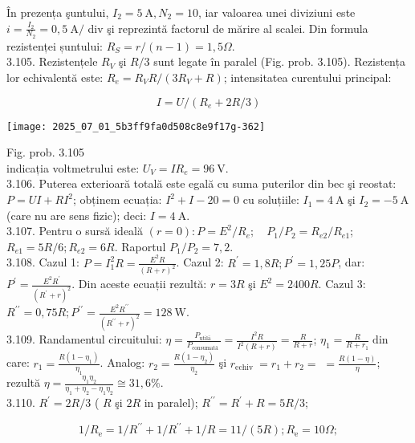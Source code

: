 În prezența şuntului, $I_{2}=5 \mathrm{~A}, N_{2}=10$, iar valoarea unei diviziuni este $i=\frac{I_{2}}{N_{2}}=0,5 \mathrm{~A} /$ div şi reprezintă factorul de mărire al scalei. Din formula rezistenței șuntului: $R_{S}=r /(n-1)=1,5 \Omega$.\\
3.105. Rezistențele $R_{V}$ şi $R / 3$ sunt legate în paralel (Fig. prob. 3.105). Rezistența lor echivalentă este: $R_{e}=R_{V} R /\left(3 R_{V}+R\right)$; intensitatea curentului principal:

$$
I=U /\left(R_{e}+2 R / 3\right)
$$

\begin{center}
\texttt{[image: 2025\_07\_01\_5b3ff9fa0d508c8e9f17g-362]}
\end{center}

Fig. prob. 3.105\\
indicația voltmetrului este: $U_{V}=I R_{e}=96 \mathrm{~V}$.\\
3.106. Puterea exterioară totală este egală cu suma puterilor din bec şi reostat: $P=U I+R I^{2}$; obținem ecuația: $I^{2}+I-20=0$ cu soluțiile: $I_{1}=4 \mathrm{~A}$ şi $I_{2}=-5 \mathrm{~A}$ (care nu are sens fizic); deci: $I=4 \mathrm{~A}$.\\
3.107. Pentru o sursă ideală $(r=0): P=E^{2} / R_{e} ; \quad P_{1} / P_{2}=R_{e 2} / R_{e 1}$; $R_{e 1}=5 R / 6 ; R_{e 2}=6 R$. Raportul $P_{1} / P_{2}=7,2$.\\
3.108. Cazul 1: $P=I_{1}^{2} R=\frac{E^{2} R}{(R+r)^{2}}$. Cazul 2: $R^{\prime}=1,8 R ; P^{\prime}=1,25 P$, dar: $P^{\prime}=\frac{E^{2} R^{\prime}}{\left(R^{\prime}+r\right)^{2}}$. Din aceste ecuații rezultă: $r=3 R$ şi $E^{2}=2400 R$. Cazul 3: $R^{\prime \prime}=0,75 R ; P^{\prime \prime}=\frac{E^{2} R^{\prime \prime}}{\left(R^{\prime \prime}+r\right)^{2}}=128 \mathrm{~W}$.\\
3.109. Randamentul circuitului: $\eta=\frac{P_{\text {utilā }}}{P_{\text {consumată }}}=\frac{I^{2} R}{I^{2}(R+r)}=\frac{R}{R+r}$; $\eta_{1}=\frac{R}{R+r_{1}} \operatorname{din}$ care: $r_{1}=\frac{R\left(1-\eta_{1}\right)}{\eta_{1}}$. Analog: $r_{2}=\frac{R\left(1-\eta_{2}\right)}{\eta_{2}}$ şi $r_{\text {echiv }}=r_{1}+r_{2}=$ $=\frac{R(1-\eta)}{\eta}$; rezultă $\eta=\frac{\eta_{1} \eta_{2}}{\eta_{1}+\eta_{2}-\eta_{1} \eta_{2}} \cong 31,6 \%$.\\
3.110. $R^{\prime}=2 R / 3$ ( $R$ şi $2 R$ in paralel); $R^{\prime \prime}=R^{\prime}+R=5 R / 3$;

$$
1 / R_{\mathrm{e}}=1 / R^{\prime \prime}+1 / R^{\prime \prime}+1 / R=11 /(5 R) ; R_{\mathrm{e}}=10 \Omega ;
$$

